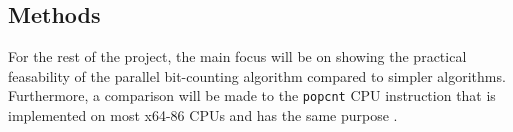 
\subsection{Methods}
% 
For the rest of the project, the main focus will be on showing the practical feasability of the parallel bit-counting algorithm compared to simpler algorithms. Furthermore, a comparison will be made to the \texttt{popcnt} CPU instruction that is implemented on most x64-86 CPUs and has the same purpose \cite{popcnt}.

